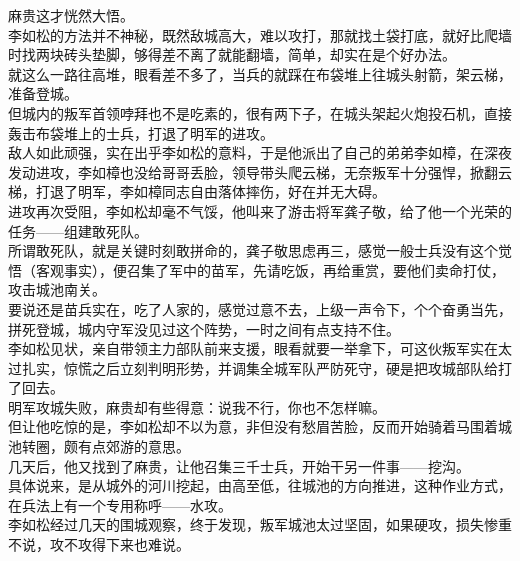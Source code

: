 \begin{multicols}{\theparacolNo}
麻贵这才恍然大悟。\\

李如松的方法并不神秘，既然敌城高大，难以攻打，那就找土袋打底，就好比爬墙时找两块砖头垫脚，够得差不离了就能翻墙，简单，却实在是个好办法。\\

就这么一路往高堆，眼看差不多了，当兵的就踩在布袋堆上往城头射箭，架云梯，准备登城。\\

但城内的叛军首领哱拜也不是吃素的，很有两下子，在城头架起火炮投石机，直接轰击布袋堆上的士兵，打退了明军的进攻。\\

敌人如此顽强，实在出乎李如松的意料，于是他派出了自己的弟弟李如樟，在深夜发动进攻，李如樟也没给哥哥丢脸，领导带头爬云梯，无奈叛军十分强悍，掀翻云梯，打退了明军，李如樟同志自由落体摔伤，好在并无大碍。\\

进攻再次受阻，李如松却毫不气馁，他叫来了游击将军龚子敬，给了他一个光荣的任务——组建敢死队。\\

所谓敢死队，就是关键时刻敢拼命的，龚子敬思虑再三，感觉一般士兵没有这个觉悟（客观事实），便召集了军中的苗军，先请吃饭，再给重赏，要他们卖命打仗，攻击城池南关。\\

要说还是苗兵实在，吃了人家的，感觉过意不去，上级一声令下，个个奋勇当先，拼死登城，城内守军没见过这个阵势，一时之间有点支持不住。\\

李如松见状，亲自带领主力部队前来支援，眼看就要一举拿下，可这伙叛军实在太过扎实，惊慌之后立刻判明形势，并调集全城军队严防死守，硬是把攻城部队给打了回去。\\

明军攻城失败，麻贵却有些得意：说我不行，你也不怎样嘛。\\

但让他吃惊的是，李如松却不以为意，非但没有愁眉苦脸，反而开始骑着马围着城池转圈，颇有点郊游的意思。\\

几天后，他又找到了麻贵，让他召集三千士兵，开始干另一件事——挖沟。\\

具体说来，是从城外的河川挖起，由高至低，往城池的方向推进，这种作业方式，在兵法上有一个专用称呼——水攻。\\

李如松经过几天的围城观察，终于发现，叛军城池太过坚固，如果硬攻，损失惨重不说，攻不攻得下来也难说。\\


\end{multicols}
